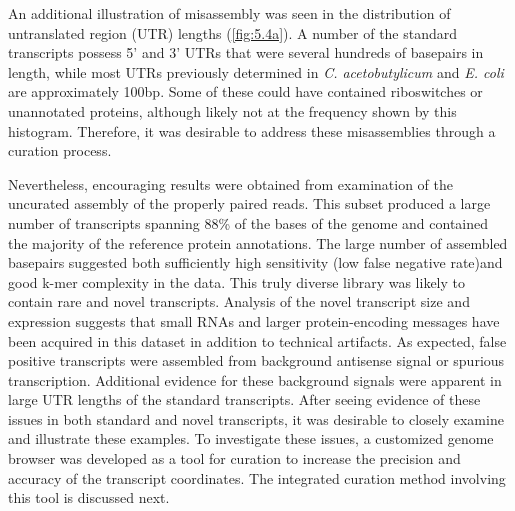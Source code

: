 An additional illustration of misassembly was seen in the distribution of untranslated region (UTR) lengths (\ref{fig:5.4a}). A number of the standard transcripts possess 5' and 3' UTRs that were several hundreds of basepairs in length, while most UTRs previously determined in \textit{C. acetobutylicum}\cite{63,64,69,74,76} and \textit{E. coli}\cite{87} are approximately 100bp. Some of these could have contained riboswitches or unannotated proteins, although likely not at the frequency shown by this histogram. Therefore, it was desirable to address these misassemblies through a curation process.

Nevertheless, encouraging results were obtained from examination of the uncurated assembly of the properly paired reads. This subset produced a large number of transcripts spanning 88\% of the bases of the genome and contained the majority of the reference protein annotations. The large number of assembled basepairs suggested both sufficiently high sensitivity (low false negative rate)and good k-mer complexity in the data. This truly diverse library was likely to contain rare and novel transcripts. Analysis of the novel transcript size and expression suggests that small RNAs and larger protein-encoding messages have been acquired in this dataset in addition to technical artifacts. As expected, false positive transcripts were assembled from background antisense signal or spurious transcription. Additional evidence for these background signals were apparent in large UTR lengths of the standard transcripts. After seeing evidence of these issues in both standard and novel transcripts, it was desirable to closely examine and illustrate these examples. To investigate these issues, a customized genome browser was developed as a tool for curation to increase the precision and accuracy of the transcript coordinates. The integrated curation method involving this tool is discussed next.









